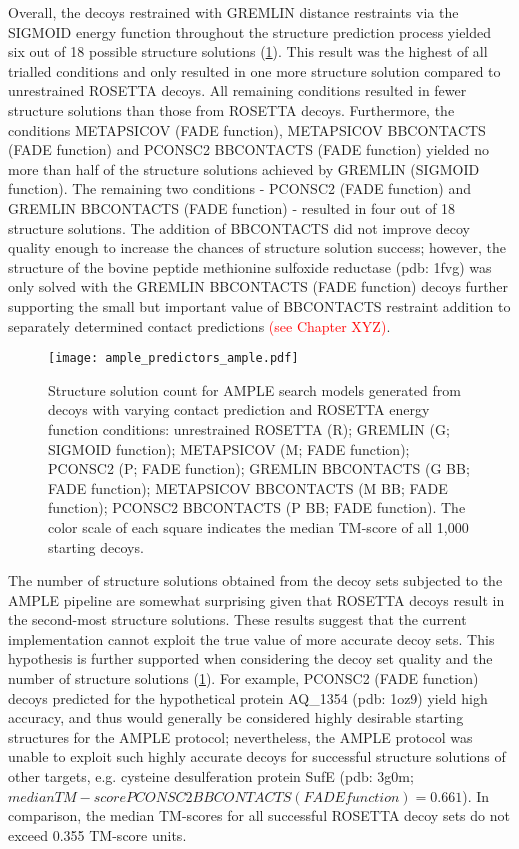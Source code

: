 Overall, the decoys restrained with GREMLIN distance restraints via the SIGMOID energy function throughout the structure prediction process yielded six out of 18 possible structure solutions (\cref{fig:ample_predictor_ample}). This result was the highest of all trialled conditions and only resulted in one more structure solution compared to unrestrained ROSETTA decoys. All remaining conditions resulted in fewer structure solutions than those from ROSETTA decoys. Furthermore, the conditions METAPSICOV (FADE function), METAPSICOV BBCONTACTS (FADE function) and PCONSC2 BBCONTACTS (FADE function) yielded no more than half of the structure solutions achieved by GREMLIN (SIGMOID function). The remaining two conditions - PCONSC2 (FADE function) and GREMLIN BBCONTACTS (FADE function) - resulted in four out of 18 structure solutions. The addition of BBCONTACTS did not improve decoy quality enough to increase the chances of structure solution success; however, the structure of the bovine peptide methionine sulfoxide reductase (\gls{pdb}: 1fvg) was only solved with the GREMLIN BBCONTACTS (FADE function) decoys further supporting the small but important value of BBCONTACTS restraint addition to separately determined contact predictions \textcolor{red}{(see Chapter XYZ)}.

\begin{figure}[H]
    \centering
    \texttt{[image: ample\_predictors\_ample.pdf]}
    \caption{Structure solution count for AMPLE search models generated from decoys with varying contact prediction and ROSETTA energy function conditions: unrestrained ROSETTA (R); GREMLIN (G; SIGMOID function); METAPSICOV (M; FADE function); PCONSC2  (P; FADE function); GREMLIN BBCONTACTS (G BB; FADE function); METAPSICOV BBCONTACTS (M BB; FADE function); PCONSC2 BBCONTACTS (P BB; FADE function). The color scale of each square indicates the median TM-score of all 1,000 starting decoys.}
    \label{fig:ample_predictor_ample}
\end{figure}

The number of structure solutions obtained from the decoy sets subjected to the AMPLE pipeline are somewhat surprising given that ROSETTA decoys result in the second-most structure solutions. These results suggest that the current implementation cannot exploit the true value of more accurate decoy sets. This hypothesis is further supported when considering the decoy set quality and the number of structure solutions (\cref{fig:ample_predictor_ample}). For example, PCONSC2 (FADE function) decoys predicted for the hypothetical protein AQ\_1354 (\gls{pdb}: 1oz9) yield high accuracy, and thus would generally be considered highly desirable starting structures for the AMPLE protocol; nevertheless, the AMPLE protocol was unable to exploit such highly accurate decoys for successful structure solutions of other targets, e.g. cysteine desulferation protein SufE (\gls{pdb}: 3g0m; $median TM-score PCONSC2 BBCONTACTS (FADE function)=0.661$). In comparison, the median TM-scores for all successful ROSETTA decoy sets do not exceed 0.355 TM-score units.

